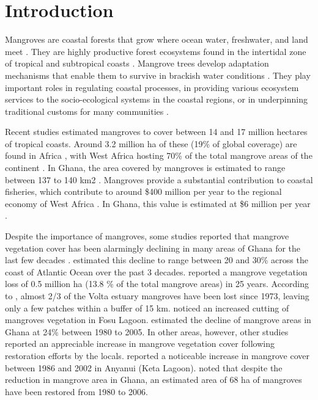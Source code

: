 \documentclass[12pt,oneside,preprint,3p,authoryear,times]{elsarticle} %
\begin{document}
\hypertarget{introduction}{%
\section{Introduction}\label{introduction}}

Mangroves are coastal forests that grow where ocean water, freshwater,
and land meet \citep{CILSS-2016}. They are highly productive forest
ecosystems found in the intertidal zone of tropical and subtropical
coasts
\citep{Spalding-et-al-1997, Spalding-et-al-2010, Wang-et-al-2019}.
Mangrove trees develop adaptation mechanisms that enable them to survive
in brackish water conditions
\citep{Spalding-et-al-1997, Spalding-et-al-2010}. They play important
roles in regulating coastal processes, in providing various ecosystem
services to the socio-ecological systems in the coastal regions, or in
underpinning traditional customs for many communities
\citep{Ajonina-et-al-2013, Levy-et-al-2015, UNEP-2007, Wilkie-and-Fortuna-2003}.

Recent studies \citep{Rubin-et-al-1999, Wilkie-and-Fortuna-2003}
estimated mangroves to cover between 14 and 17 million hectares of
tropical coasts. Around 3.2 million ha of these (19\% of global
coverage) are found in Africa \citep{Ajonina-et-al-2013}, with West
Africa hosting 70\% of the total mangrove areas of the continent
\citep{UNEP-2007}. In Ghana, the area covered by mangroves is estimated
to range between 137 to 140 km2 \citep{Armah-et-al-2009, UNEP-2007}.
Mangroves provide a substantial contribution to coastal fisheries, which
contribute to around \$400 million per year to the regional economy of
West Africa \citep{USGS-EROS-2016}. In Ghana, this value is estimated at
\$6 million per year \citep{Armah-et-al-2009}.

Despite the importance of mangroves, some studies reported that mangrove
vegetation cover has been alarmingly declining in many areas of Ghana
for the last few decades \citep{Asante-et-al-2017}.
\citet{Armah-et-al-2009} estimated this decline to range between 20 and
30\% across the coast of Atlantic Ocean over the past 3 decades.
\citet{FAO-2007} reported a mangrove vegetation loss of 0.5 million ha
(13.8 \% of the total mangrove areas) in 25 years. According to
\citet{Rubin-et-al-1999}, almost 2/3 of the Volta estuary mangroves have
been lost since 1973, leaving only a few patches within a buffer of 15
km. \citet{Darkwa-and-Smardon-2010} noticed an increased cutting of
mangroves vegetation in Fosu Lagoon. \citet{FAO-2007} estimated the
decline of mangrove areas in Ghana at 24\% between 1980 to 2005. In
other areas, however, other studies reported an appreciable increase in
mangrove vegetation cover following restoration efforts by the locals.
\citet{Awo-et-al-2014} reported a noticeable increase in mangrove cover
between 1986 and 2002 in Anyanui (Keta Lagoon). \citet{Feka-2015} noted
that despite the reduction in mangrove area in Ghana, an estimated area
of 68 ha of mangroves have been restored from 1980 to 2006.
\end{document}
